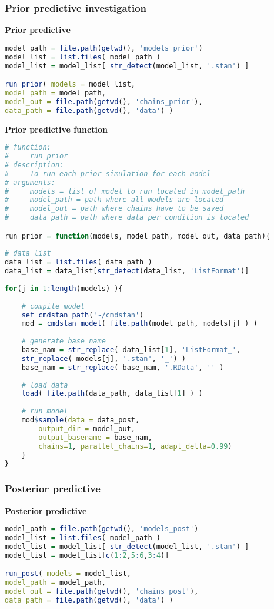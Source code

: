 \subsubsection{Prior predictive investigation}

\noindent \textbf{Prior predictive}
%
\begin{lstlisting}[language=R]
model_path = file.path(getwd(), 'models_prior')
model_list = list.files( model_path )
model_list = model_list[ str_detect(model_list, '.stan') ]

run_prior( models = model_list,
model_path = model_path,
model_out = file.path(getwd(), 'chains_prior'),
data_path = file.path(getwd(), 'data') )
\end{lstlisting}


\noindent \textbf{Prior predictive function}
%
\begin{lstlisting}[language=R]
# function:
#     run_prior
# description:  
#     To run each prior simulation for each model
# arguments:
#     models = list of model to run located in model_path
#     model_path = path where all models are located
#     model_out = path where chains have to be saved
#     data_path = path where data per condition is located

run_prior = function(models, model_path, model_out, data_path){
	
# data list
data_list = list.files( data_path )
data_list = data_list[str_detect(data_list, 'ListFormat')]
	
for(j in 1:length(models) ){
		
	# compile model
	set_cmdstan_path('~/cmdstan')
	mod = cmdstan_model( file.path(model_path, models[j] ) )
	
	# generate base name
	base_nam = str_replace( data_list[1], 'ListFormat_', 
	str_replace( models[j], '.stan', '_') )
	base_nam = str_replace( base_nam, '.RData', '' )
		
	# load data
	load( file.path(data_path, data_list[1] ) )
		
	# run model
	mod$sample(data = data_post, 
		output_dir = model_out, 
		output_basename = base_nam,
		chains=1, parallel_chains=1, adapt_delta=0.99)
	}
}
\end{lstlisting}


\subsubsection{Posterior predictive}

\noindent \textbf{Posterior predictive}
%
\begin{lstlisting}[language=R]
model_path = file.path(getwd(), 'models_post')
model_list = list.files( model_path )
model_list = model_list[ str_detect(model_list, '.stan') ]
model_list = model_list[c(1:2,5:6,3:4)]

run_post( models = model_list,
model_path = model_path,
model_out = file.path(getwd(), 'chains_post'),
data_path = file.path(getwd(), 'data') )
\end{lstlisting}


